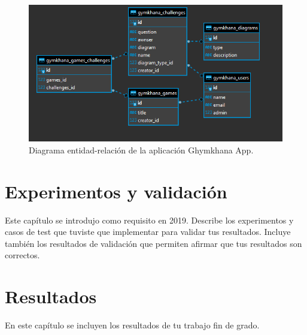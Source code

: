 \documentclass[a4paper, 12pt]{book}
\begin{document}
\begin{figure}
	\centering
	\includegraphics[width=16cm, keepaspectratio]{img/ghymkhana_ER.png}
	\caption{Diagrama entidad-relación de la aplicación Ghymkhana App.}\label{fig:diagarma_ER}
\end{figure}




\cleardoublepage

\chapter{Experimentos y validación}

Este capítulo se introdujo como requisito en 2019. 
Describe los experimentos y casos de test que tuviste que implementar para validar tus resultados. 
Incluye también los resultados de validación que permiten afirmar que tus resultados son correctos. 



\cleardoublepage
\chapter{Resultados}

En este capítulo se incluyen los resultados de tu trabajo fin de grado.
\end{document}
